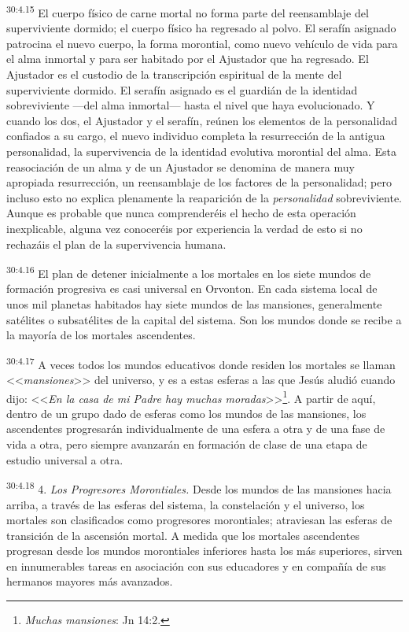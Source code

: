 \par
\textsuperscript{30:4.15} El cuerpo físico de carne mortal no forma parte del reensamblaje del superviviente dormido; el cuerpo físico ha regresado al polvo. El serafín asignado patrocina el nuevo cuerpo, la forma morontial, como nuevo vehículo de vida para el alma inmortal y para ser habitado por el Ajustador que ha regresado. El Ajustador es el custodio de la transcripción espiritual de la mente del superviviente dormido. El serafín asignado es el guardián de la identidad sobreviviente ---del alma inmortal--- hasta el nivel que haya evolucionado. Y cuando los dos, el Ajustador y el serafín, reúnen los elementos de la personalidad confiados a su cargo, el nuevo individuo completa la resurrección de la antigua personalidad, la supervivencia de la identidad evolutiva morontial del alma. Esta reasociación de un alma y de un Ajustador se denomina de manera muy apropiada resurrección, un reensamblaje de los factores de la personalidad; pero incluso esto no explica plenamente la reaparición de la \textit{personalidad} sobreviviente. Aunque es probable que nunca comprenderéis el hecho de esta operación inexplicable, alguna vez conoceréis por experiencia la verdad de esto si no rechazáis el plan de la supervivencia humana.

\par
\textsuperscript{30:4.16} El plan de detener inicialmente a los mortales en los siete mundos de formación progresiva es casi universal en Orvonton. En cada sistema local de unos mil planetas habitados hay siete mundos de las mansiones, generalmente satélites o subsatélites de la capital del sistema. Son los mundos donde se recibe a la mayoría de los mortales ascendentes.

\par
\textsuperscript{30:4.17} A veces todos los mundos educativos donde residen los mortales se llaman <<\textit{mansiones}>> del universo, y es a estas esferas a las que Jesús aludió cuando dijo: <<\textit{En la casa de mi Padre hay muchas moradas}>>\footnote{\textit{Muchas mansiones}: Jn 14:2.}. A partir de aquí, dentro de un grupo dado de esferas como los mundos de las mansiones, los ascendentes progresarán individualmente de una esfera a otra y de una fase de vida a otra, pero siempre avanzarán en formación de clase de una etapa de estudio universal a otra.

\par
\textsuperscript{30:4.18} 4. \textit{Los Progresores Morontiales.} Desde los mundos de las mansiones hacia arriba, a través de las esferas del sistema, la constelación y el universo, los mortales son clasificados como progresores morontiales; atraviesan las esferas de transición de la ascensión mortal. A medida que los mortales ascendentes progresan desde los mundos morontiales inferiores hasta los más superiores, sirven en innumerables tareas en asociación con sus educadores y en compañía de sus hermanos mayores más avanzados.

